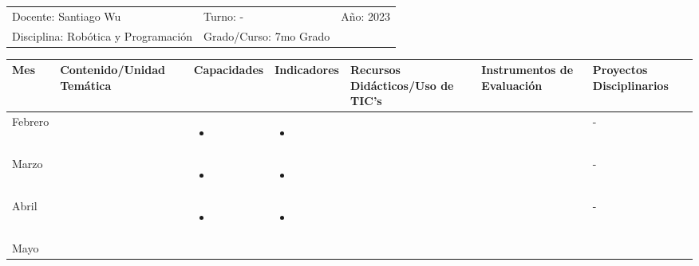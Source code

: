 \documentclass[landscape, a4paper, 10pt]{article}
\newcommand{\smallcellwidth}{0.7in}
\newcommand{\normalcellwidth}{1.2in}
\newcommand{\bigcellwidth}{2.0in}
\newcommand{\profesor}{Santiago Wu}
\newcommand{\discipline}{Robótica y Programación}
\newcommand{\currentyear}{2023}
\begin{document}
	\pagebreak[4]
	\begin{tabularx}{\textwidth}{ >{\raggedright\arraybackslash}X >{\raggedright\arraybackslash}X >{\raggedright\arraybackslash}X }
		Docente: \profesor &
		Turno: - &
		Año: \currentyear \\
		Disciplina: \discipline &
		Grado/Curso: 7mo Grado &
		 \\
	\end{tabularx}
	\centering
	\begin{longtable}{|m{\smallcellwidth}|p{\normalcellwidth}|p{\bigcellwidth}|p{\bigcellwidth}|p{\normalcellwidth}|p{\normalcellwidth}|p{\normalcellwidth}|}
	
		\hline
		\textbf{Mes} &
		\textbf{Contenido/Unidad Temática} &
		\textbf{Capacidades} &
		\textbf{Indicadores} &
		\textbf{Recursos Didácticos/Uso de TIC's} &
		\textbf{Instrumentos de Evaluación} &
		\textbf{Proyectos Disciplinarios} \\
		\hline
		\endhead
		Febrero &
		 &
		\begin{itemize}
			\item 
		\end{itemize} &
		\begin{itemize}
			\item 
		\end{itemize} &
		  &
		  &
		 - \\
		\hline
		Marzo &
		 &
		\begin{itemize}
			\item 
		\end{itemize} &
		\begin{itemize}
			\item 
		\end{itemize} &
		  &
		  &
		 - \\
		\hline
		Abril &
		 &
		\begin{itemize}
			\item 
		\end{itemize} &
		\begin{itemize}
			\item 
		\end{itemize} &
		  &
		  &
		 - \\
		\hline
		Mayo &
		 &
		\begin{itemize}

\end{itemize}
\end{longtable}
\end{document}
